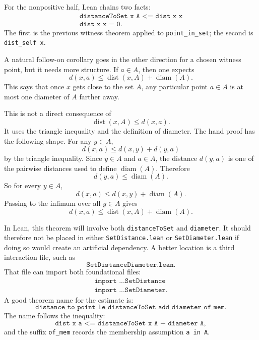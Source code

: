 \begin{remark*}
For the nonpositive half, Lean chains two facts:
\[
\begin{gathered}
  \texttt{distanceToSet x A <= dist x x}\\
  \texttt{dist x x = 0.}
\end{gathered}
\]
The first is the previous witness theorem applied to \texttt{point\_in\_set};
the second is \texttt{dist\_self x}.
\end{remark*}

\begin{remark*}
A natural follow-on corollary goes in the other direction for a chosen witness
point, but it needs more structure. If \(a \in A\), then one expects
\[
  d(x,a) \le \operatorname{dist}(x,A) + \operatorname{diam}(A).
\]
This says that once \(x\) gets close to the set \(A\), any particular point
\(a \in A\) is at most one diameter of \(A\) farther away.

This is not a direct consequence of
\[
  \operatorname{dist}(x,A) \le d(x,a).
\]
It uses the triangle inequality and the definition of diameter. The hand proof
has the following shape. For any \(y \in A\),
\[
  d(x,a) \le d(x,y) + d(y,a)
\]
by the triangle inequality. Since \(y \in A\) and \(a \in A\), the distance
\(d(y,a)\) is one of the pairwise distances used to define
\(\operatorname{diam}(A)\). Therefore
\[
  d(y,a) \le \operatorname{diam}(A).
\]
So for every \(y \in A\),
\[
  d(x,a) \le d(x,y) + \operatorname{diam}(A).
\]
Passing to the infimum over all \(y \in A\) gives
\[
  d(x,a) \le \operatorname{dist}(x,A) + \operatorname{diam}(A).
\]

In Lean, this theorem will involve both \texttt{distanceToSet} and
\texttt{diameter}. It should therefore not be placed in either
\texttt{SetDistance.lean} or \texttt{SetDiameter.lean} if doing so would create
an artificial dependency. A better location is a third interaction file, such
as
\[
  \texttt{SetDistanceDiameter.lean}.
\]
That file can import both foundational files:
\[
\begin{gathered}
  \texttt{import ...SetDistance}\\
  \texttt{import ...SetDiameter.}
\end{gathered}
\]
A good theorem name for the estimate is:
\[
  \texttt{distance\_to\_point\_le\_distanceToSet\_add\_diameter\_of\_mem}.
\]
The name follows the inequality:
\[
  \texttt{dist x a <= distanceToSet x A + diameter A},
\]
and the suffix \texttt{of\_mem} records the membership assumption
\texttt{a in A}.
\end{remark*}

